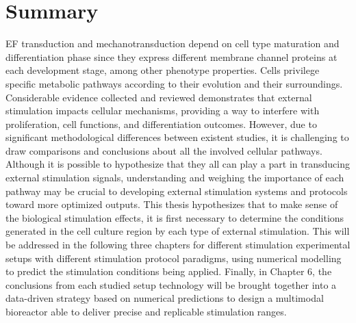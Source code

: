 \section{Summary}
\ac{EF} transduction and mechanotransduction depend on cell type maturation and differentiation phase since they express different membrane channel proteins at each development stage, among other phenotype properties. Cells privilege specific metabolic pathways according to their evolution and their surroundings. Considerable evidence collected and reviewed demonstrates that external stimulation impacts cellular mechanisms, providing a way to interfere with proliferation, cell functions, and differentiation outcomes. However, due to significant methodological differences between existent studies, it is challenging to draw comparisons and conclusions about all the involved cellular pathways. Although it is possible to hypothesize that they all can play a part in transducing external stimulation signals, understanding and weighing the importance of each pathway may be crucial to developing external stimulation systems and protocols toward more optimized outputs. This thesis hypothesizes that to make sense of the biological stimulation effects, it is first necessary to determine the conditions generated in the cell culture region by each type of external stimulation. This will be addressed in the following three chapters for different stimulation experimental setups with different stimulation protocol paradigms, using numerical modelling to predict the stimulation conditions being applied. Finally, in Chapter 6, the conclusions from each studied setup technology will be brought together into a data-driven strategy based on numerical predictions to design a multimodal bioreactor able to deliver precise and replicable stimulation ranges. 



% 
%
%